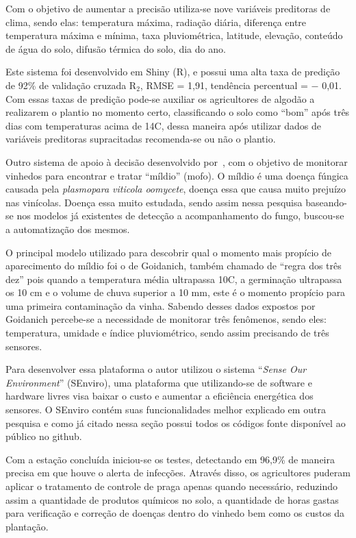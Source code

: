 \documentclass[
article,			%
12pt,				%
oneside,			%
a4paper,			%
english,			%
brazil,				%
sumario=tradicional
]{abntex2}
\begin{document}
Com o objetivo de aumentar a precisão utiliza-se nove variáveis preditoras de clima, sendo elas: temperatura máxima, radiação diária, diferença entre temperatura máxima e mínima, taxa pluviométrica, latitude, elevação, conteúdo de água do solo, difusão térmica do solo, dia do ano.

Este sistema foi desenvolvido em Shiny (R), e possui uma alta taxa de predição de 92\% de validação cruzada R$_{2}$, RMSE = 1,91, tendência percentual = $-$ 0,01.
Com essas taxas de predição pode-se auxiliar os agricultores de algodão a realizarem o plantio no momento certo, classificando o solo como ``bom'' após três dias com temperaturas acima de 14\textdegree C, dessa maneira após utilizar dados de variáveis preditoras supracitadas recomenda-se ou não o plantio.

Outro sistema de apoio à decisão desenvolvido por~\citeauthor{2}, com o objetivo de monitorar vinhedos para encontrar e tratar ``míldio'' (mofo).
O míldio é uma doença fúngica causada pela \textit{plasmopara viticola oomycete}, doença essa que causa muito prejuízo nas vinícolas\cite{2}. Doença essa muito estudada, sendo assim nessa pesquisa baseando-se nos modelos já existentes de detecção a acompanhamento do fungo, buscou-se a automatização dos mesmos.

O principal modelo utilizado para descobrir qual o momento mais propício de aparecimento do míldio foi o de Goidanich\cite{detectando_milidio}, também chamado de ``regra dos três dez'' pois quando a temperatura média ultrapassa 10\textdegree C, a germinação ultrapassa os 10 cm e o volume de chuva superior a 10 mm, este é o momento propício para uma primeira contaminação da vinha.
Sabendo desses dados expostos por Goidanich\cite{detectando_milidio} percebe-se a necessidade de monitorar três fenômenos, sendo eles: temperatura, umidade e índice pluviométrico, sendo assim precisando de três sensores.

Para desenvolver essa plataforma o autor utilizou o sistema ``\textit{Sense Our Environment}'' (SEnviro), uma plataforma que utilizando-se de software e hardware livres visa baixar o custo e aumentar a eficiência energética dos sensores\cite{2}. O SEnviro contém suas funcionalidades melhor explicado em outra pesquisa\cite{SEnviro} e como já citado nessa seção possui todos os códigos fonte disponível ao público no github\cite{SEnviro_Github}.


Com a estação concluída iniciou-se os testes, detectando em 96,9\% de maneira precisa em que houve o alerta de infecções. Através disso, os agricultores puderam aplicar o tratamento de controle de praga apenas quando necessário, reduzindo assim a quantidade de produtos químicos no solo, a quantidade de horas gastas para verificação e correção de doenças dentro do vinhedo bem como os custos da plantação.
\end{document}
